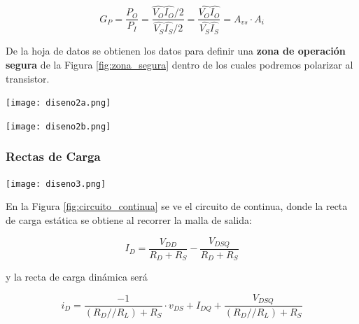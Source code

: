 \begin{multicols}{2}
        \begin{equation}
        	G_P = \frac{P_O}{P_I} = \frac{\hat{V_O}\hat{I_O}/2}{\hat{V_S}\hat{I_S}/2} = \frac{\hat{V_O}\hat{I_O}}{\hat{V_S}\hat{I_S}} = A_{vs}\cdot A_{i}
        	\end{equation}

        De la hoja de datos se obtienen los datos para definir una \textbf{zona de operación segura} de la Figura \ref{fig:zona_segura} dentro de los cuales podremos polarizar al transistor.



        \begin{center}
                   \texttt{[image: diseno2a.png]}
                   \label{fig:zona_segura}
        \end{center}

        \begin{center}
                   \texttt{[image: diseno2b.png]}
                   \label{fig:rectas_carga}
        \end{center}



        \subsubsection{Rectas de Carga}


        \begin{center}
                   \texttt{[image: diseno3.png]}
                   \label{fig:circuito_continua}
        \end{center}

        En la Figura \ref{fig:circuito_continua} se ve el circuito de continua, donde la recta de carga estática se obtiene al recorrer la malla de salida:

        \begin{equation}
        	I_D = \frac{V_{DD}}{R_D + R_S} - \frac{V_{DSQ}}{R_D + R_S}
        	\end{equation}

        y la recta de carga dinámica será

        \begin{equation}
        	i_D = \frac{-1}{(R_D//R_L) + R_S}\cdot v_{DS} + I_{DQ} + \frac{V_{DSQ}}{(R_D//R_L) + R_S}
        	\end{equation}



\end{multicols}
